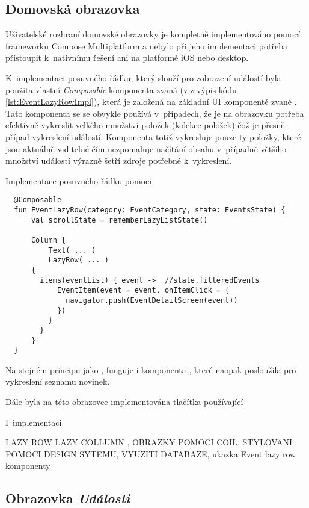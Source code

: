 \subsection{Domovská obrazovka}
Uživatelské rozhraní domovské obrazovky je kompletně implementováno pomocí frameworku Compose Multiplatform a nebylo při jeho implementaci potřeba
přistoupit k~nativnímu řešení ani na platformě iOS nebo desktop.

K~implementaci posuvného řádku, který slouží pro zobrazení událostí byla použita vlastní \textit{Composable} komponenta zvaná  
(viz výpis kódu \ref{lst:EventLazyRowImpl}),
která je založená na základní UI komponentě zvané . Tato komponenta se se obvykle používá v~případech, že je na obrazovku potřeba efektivně 
vykreslit velkého množství položek (kolekce položek) čož je přesně případ vykreslení událostí. Komponenta  totiž vykresluje pouze ty položky,
které jsou aktuálně viditelné čím nezpomaluje načítání obsahu v~případně většího množství událostí výrazně šetří zdroje potřebné k~vykreslení.

\begin{listing}[H]
\caption{Implementace posuvného řádku pomocí }\label{lst:EventLazyRowImpl}
\begin{verbatim}
  @Composable
  fun EventLazyRow(category: EventCategory, state: EventsState) {
      val scrollState = rememberLazyListState()
  
      Column {
          Text( ... )
          LazyRow( ... ) 
      {
        items(eventList) { event ->  //state.filteredEvents
            EventItem(event = event, onItemClick = {
              navigator.push(EventDetailScreen(event))
            })
          }
        }
      }
  }
\end{verbatim}
\end{listing}

Na stejném principu jako , funguje i komponenta , které naopak posloužila pro vykreslení seznamu novinek.

Dále byla na této obrazovce implementována tlačítka používající 

I~implementaci 

LAZY ROW LAZY COLLUMN , OBRAZKY POMOCI COIL, STYLOVANI POMOCI DESIGN SYTEMU, VYUZITI DATABAZE, ukazka Event lazy row komponenty



\subsection{Obrazovka \textit{Události}}

